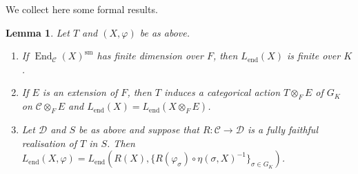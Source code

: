\documentclass[a4paper,10pt]{amsart}
\theoremstyle{plain}
\newtheorem{lemma}[theorem]{Lemma}
\theoremstyle{definition}
\theoremstyle{remark}
\def\mr#1{\mathrm{#1}}
\def\Ccal{\mathcal{C}}
\def\Dcal{\mathcal{D}}
\DeclareMathOperator{\End}{End}
\begin{document}
We collect here some formal results.
\begin{lemma}\label{lemma: min endo gen prop} Let \(T\) and \((X, \varphi)\) be as above.
\begin{enumerate}
    \item \label{lemma: min endo gen prop 1} If \(\End_{\Ccal}(X)^\mr{sm}\) has finite dimension over \(F\), then \(L_{\mr{end}}(X)\) is finite over \(K\).
    \item \label{lemma: min endo gen prop 2} If \(E\) is an extension of \(F\), then \(T\) induces a categorical action \(T \otimes_F E\) of \(G_K\) on \(\Ccal \otimes_F E\) and \(L_{\mr{end}}(X) = L_{\mr{end}}(X \otimes_F E)\).
    \item \label{lemma: min endo gen prop 3} Let \(\Dcal\) and \(S\) be as above and suppose that \(R \colon \Ccal \to \Dcal\) is a fully faithful realisation of \(T\) in \(S\). Then \(L_{\mr{end}}(X, \varphi) = L_{\mr{end}}(R(X), \{R(\varphi_\sigma) \circ \eta(\sigma, X)^{-1}\}_{\sigma \in G_K})\).
\end{enumerate}
\end{lemma}
\end{document}
